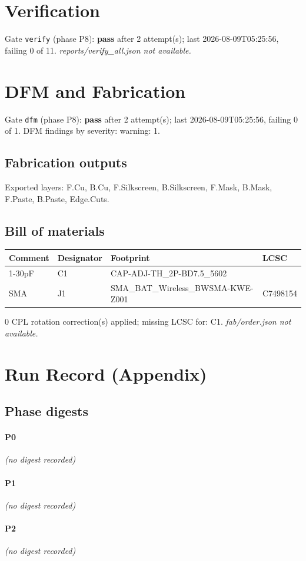 \documentclass[11pt,a4paper]{article}
\begin{document}
\section{Verification}
Gate \texttt{verify} (phase P8): \textbf{pass} after 2 attempt(s); last 2026-08-09T05:25:56, failing 0 of 11.
\emph{reports/verify\_all.json not available.}
\section{DFM and Fabrication}
Gate \texttt{dfm} (phase P8): \textbf{pass} after 2 attempt(s); last 2026-08-09T05:25:56, failing 0 of 1.
DFM findings by severity: warning: 1.
\subsection*{Fabrication outputs}
Exported layers: F.Cu, B.Cu, F.Silkscreen, B.Silkscreen, F.Mask, B.Mask, F.Paste, B.Paste, Edge.Cuts.
\subsection*{Bill of materials}
{\small
\begin{longtable}{p{4.4cm}p{2.8cm}p{4.6cm}l}
\toprule
\textbf{Comment} & \textbf{Designator} & \textbf{Footprint} & \textbf{LCSC} \\
\midrule
\endhead
1-30pF & C1 & CAP-ADJ-TH\_2P-BD7.5\_5602 &  \\
SMA & J1 & SMA\_BAT\_Wireless\_BWSMA-KWE-Z001 & C7498154 \\
\bottomrule
\end{longtable}
}
0 CPL rotation correction(s) applied; missing LCSC for: C1.
\emph{fab/order.json not available.}
\section{Run Record (Appendix)}
\subsection*{Phase digests}
\paragraph*{P0}
\emph{(no digest recorded)}
\paragraph*{P1}
\emph{(no digest recorded)}
\paragraph*{P2}
\emph{(no digest recorded)}
\end{document}
